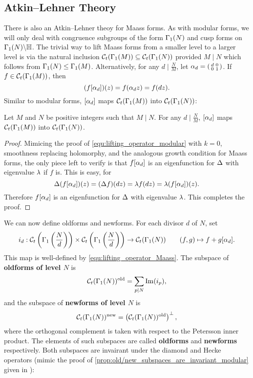     \subsection*{Atkin–Lehner Theory}
      There is also an Atkin–Lehner theoy for Maass forms. As with modular forms, we will only deal with congruence subgroups of the form $\Gamma_{1}(N)$ and cusp forms on $\Gamma_{1}(N)\backslash\mathbb{H}$. The trivial way to lift Maass forms from a smaller level to a larger level is via the natural inclusion $\mathcal{C}_{t}(\Gamma_{1}(M)) \subseteq \mathcal{C}_{t}(\Gamma_{1}(N))$ provided $M \mid N$ which follows from $\Gamma_{1}(N) \le \Gamma_{1}(M)$. Alternatively, for any $d \mid \frac{N}{M}$, let $\alpha_{d} = \begin{psmallmatrix} d & 0 \\ 0 & 1 \end{psmallmatrix}$. If $f \in \mathcal{C}_{t}(\Gamma_{1}(M))$, then
      \[
          (f[\alpha_{d}])(z) = f(\alpha_{d} z) = f(dz).
      \]
      Similar to modular forms, $[\alpha_{d}]$ maps $\mathcal{C}_{t}(\Gamma_{1}(M))$ into $\mathcal{C}_{t}(\Gamma_{1}(N))$:
      
      \begin{proposition}\label{equ:lifting_operator_Maass}
        Let $M$ and $N$ be positive integers such that $M \mid N$. For any $d \mid \frac{N}{M}$, $[\alpha_{d}]$ maps $\mathcal{C}_{t}(\Gamma_{1}(M))$ into $\mathcal{C}_{t}(\Gamma_{1}(N))$.
      \end{proposition}
      \begin{proof}
        Mimicing the proof of \cref{equ:lifting_operator_modular} with $k = 0$, smoothness replacing holomorphy, and the analogous growth condition for Maass forms, the only piece left to verify is that $f[\alpha_{d}]$ is an eigenfunction for $\Delta$ with eigenvalue $\lambda$ if $f$ is. This is easy, for
        \[
          \Delta(f[\alpha_{d}])(z) = (\Delta f)(dz) = \lambda f(dz) = \lambda(f[\alpha_{d}])(z).
        \]
        Therefore $f[\alpha_{d}]$ is an eigenfunction for $\Delta$ with eigenvalue $\lambda$. This completes the proof.
      \end{proof}

      We can now define oldforms and newforms. For each divisor $d$ of $N$, set
      \[
        i_{d}:\mathcal{C}_{t}\left(\Gamma_{1}\left(\frac{N}{d}\right)\right)\times\mathcal{C}_{t}\left(\Gamma_{1}\left(\frac{N}{d}\right)\right) \to \mathcal{C}_{t}(\Gamma_{1}(N)) \qquad (f,g) \mapsto f+g[\alpha_{d}].
      \]
      This map is well-defined by \cref{equ:lifting_operator_Maass}. The subspace of \textbf{oldforms of level $N$} is
      \[
        \mathcal{C}_{t}(\Gamma_{1}(N))^{\mathrm{old}} = \sum_{p \mid N}\mathrm{Im}(i_{p}),
      \]
      and the subspace of \textbf{newforms of level $N$} is
      \[
        \mathcal{C}_{t}(\Gamma_{1}(N))^{\mathrm{new}} = \left(\mathcal{C}_{t}(\Gamma_{1}(N))^{\mathrm{old}} \right)^{\perp},
      \]
      where the orthogonal complement is taken with respect to the Petersson inner product. The elements of such subspaces are called \textbf{oldforms} and \textbf{newforms} respectively. Both subspaces are invairant under the diamond and Hecke operators (mimic the proof of \cref{prop:old/new_subspaces_are_invariant_modular} given in \cite{diamond2005first}):

